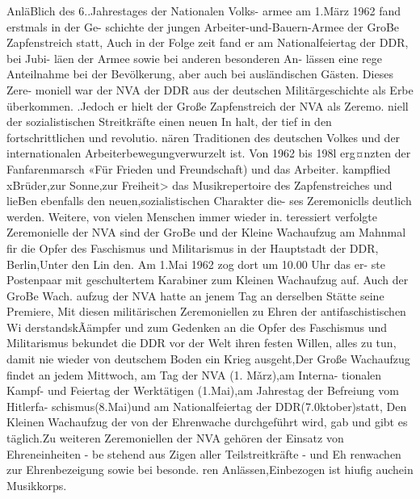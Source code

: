 

AnläBlich des 6..Jahrestages der Nationalen Volks-
armee am 1.März 1962 fand erstmals in der Ge-
schichte der jungen Arbeiter-und-Bauern-Armee
der GroBe Zapfenstreich statt, Auch in der Folge
zeit fand er am Nationalfeiertag der DDR, bei Jubi-
läen der Armee sowie bei anderen besonderen An-
lässen eine rege Anteilnahme bei der Bevölkerung, aber auch bei ausländischen Gästen. Dieses Zere-
moniell war der NVA der DDR aus der deutschen
Militärgeschichte als Erbe überkommen. .Jedoch er
hielt der Große Zapfenstreich der NVA als Zeremo.
niell der sozialistischen Streitkräfte einen neuen In
halt, der tief in den fortschrittlichen und revolutio.
nären Traditionen des deutschen Volkes und der
internationalen Arbeiterbewegungverwurzelt ist.
Von 1962 bis 198l erg¤nzten der Fanfarenmarsch
«Für Frieden und Freundschaft) und das Arbeiter.
kampflied xBrüder,zur Sonne,zur Freiheit> das
Musikrepertoire des Zapfenstreiches und lieBen
ebenfalls den neuen,sozialistischen Charakter die-
ses Zeremoniclls deutlich werden.
Weitere, von vielen Menschen immer wieder in.
teressiert verfolgte Zeremonielle der NVA sind der
GroBe und der Kleine Wachaufzug am Mahnmal
fir die Opfer des Faschismus und Militarismus in
der Hauptstadt der DDR, Berlin,Unter den Lin
den. Am 1.Mai 1962 zog dort um 10.00 Uhr das er-
ste Postenpaar mit geschultertem Karabiner zum
Kleinen Wachaufzug auf. Auch der GroBe Wach.
aufzug der NVA hatte an jenem Tag an derselben
Stätte seine Premiere, Mit diesen militärischen
Zeremoniellen zu Ehren der antifaschistischen Wi
derstandskÃämpfer und zum Gedenken an die Opfer
des Faschismus und Militarismus bekundet die
DDR vor der Welt ihren festen Willen, alles zu tun,
damit nie wieder von deutschem Boden ein Krieg
ausgeht,Der Große Wachaufzug findet an jedem
Mittwoch, am Tag der NVA (1. Mǎrz),am Interna-
tionalen Kampf- und Feiertag der Werktätigen
(1.Mai),am Jahrestag der Befreiung vom Hitlerfa-
schismus(8.Mai)und am Nationalfeiertag der
DDR(7.0ktober)statt, Den Kleinen Wachaufzug
der von der Ehrenwache durchgeführt wird, gab
und gibt es täglich.Zu weiteren Zeremoniellen der
NVA gehören der Einsatz von Ehreneinheiten - be
stehend aus Zigen aller Teilstreitkräfte - und Eh
renwachen zur Ehrenbezeigung sowie bei besonde.
ren Anlässen,Einbezogen ist hiufig auchein
Musikkorps.

